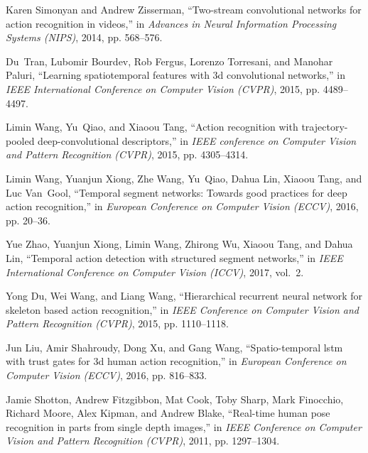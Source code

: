 \documentclass[conference]{IEEEtran}
\begin{document}
\begin{thebibliography}{10}

  Karen Simonyan and Andrew Zisserman,
  \newblock ``Two-stream convolutional networks for action recognition in
    videos,''
  \newblock in {\em Advances in Neural Information Processing Systems (NIPS)},
    2014, pp. 568--576.
  
  Du~Tran, Lubomir Bourdev, Rob Fergus, Lorenzo Torresani, and Manohar Paluri,
  \newblock ``Learning spatiotemporal features with 3d convolutional networks,''
  \newblock in {\em IEEE International Conference on Computer Vision (CVPR)},
    2015, pp. 4489--4497.
  
  Limin Wang, Yu~Qiao, and Xiaoou Tang,
  \newblock ``Action recognition with trajectory-pooled deep-convolutional
    descriptors,''
  \newblock in {\em IEEE conference on Computer Vision and Pattern Recognition
    (CVPR)}, 2015, pp. 4305--4314.
  
  Limin Wang, Yuanjun Xiong, Zhe Wang, Yu~Qiao, Dahua Lin, Xiaoou Tang, and Luc
    Van~Gool,
  \newblock ``Temporal segment networks: Towards good practices for deep action
    recognition,''
  \newblock in {\em European Conference on Computer Vision (ECCV)}, 2016, pp.
    20--36.
  
  Yue Zhao, Yuanjun Xiong, Limin Wang, Zhirong Wu, Xiaoou Tang, and Dahua Lin,
  \newblock ``Temporal action detection with structured segment networks,''
  \newblock in {\em IEEE International Conference on Computer Vision (ICCV)},
    2017, vol.~2.
  
  Yong Du, Wei Wang, and Liang Wang,
  \newblock ``Hierarchical recurrent neural network for skeleton based action
    recognition,''
  \newblock in {\em IEEE Conference on Computer Vision and Pattern Recognition
    (CVPR)}, 2015, pp. 1110--1118.
  
  Jun Liu, Amir Shahroudy, Dong Xu, and Gang Wang,
  \newblock ``Spatio-temporal lstm with trust gates for 3d human action
    recognition,''
  \newblock in {\em European Conference on Computer Vision (ECCV)}, 2016, pp.
    816--833.
  
  Jamie Shotton, Andrew Fitzgibbon, Mat Cook, Toby Sharp, Mark Finocchio, Richard
    Moore, Alex Kipman, and Andrew Blake,
  \newblock ``Real-time human pose recognition in parts from single depth
    images,''
  \newblock in {\em IEEE Conference on Computer Vision and Pattern Recognition
    (CVPR)}, 2011, pp. 1297--1304.
  

\end{thebibliography}
\end{document}
